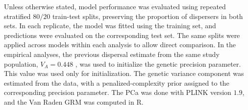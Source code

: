 Unless otherwise stated, model performance was evaluated using repeated stratified $80/20$ train-test splits, preserving the proportion of dispersers in both sets. In each replicate, the model was fitted using the training set, and predictions were evaluated on the corresponding test set. The same splits were applied across models within each analysis to allow direct comparison. In the empirical analyses, the previous dispersal estimate from the same study population, $V_A = 0.448$ \parencite{saatoglu_genetic_2024}, was used to initialize the genetic precision parameter. This value was used only for initialization. The genetic variance component was estimated from the data, with a penalized-complexity prior assigned to the corresponding precision parameter. The PCa was done with PLINK version $1.9$, and the Van Raden GRM was computed in R. 






